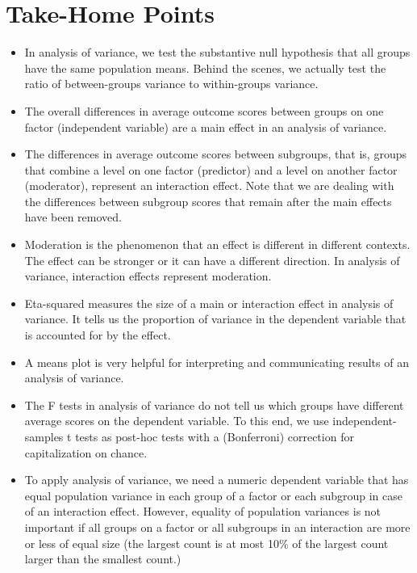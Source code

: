 \documentclass[a4paper]{book}
\theoremstyle{definition}
\theoremstyle{definition}
\theoremstyle{definition}
\theoremstyle{remark}
\begin{document}
\section{Take-Home Points}\label{take-home-points-6}

\begin{itemize}
\item
  In analysis of variance, we test the substantive null hypothesis that
  all groups have the same population means. Behind the scenes, we
  actually test the ratio of between-groups variance to within-groups
  variance.
\item
  The overall differences in average outcome scores between groups on
  one factor (independent variable) are a main effect in an analysis of
  variance.
\item
  The differences in average outcome scores between subgroups, that is,
  groups that combine a level on one factor (predictor) and a level on
  another factor (moderator), represent an interaction effect. Note that
  we are dealing with the differences between subgroup scores that
  remain after the main effects have been removed.
\item
  Moderation is the phenomenon that an effect is different in different
  contexts. The effect can be stronger or it can have a different
  direction. In analysis of variance, interaction effects represent
  moderation.
\item
  Eta-squared measures the size of a main or interaction effect in
  analysis of variance. It tells us the proportion of variance in the
  dependent variable that is accounted for by the effect.
\item
  A means plot is very helpful for interpreting and communicating
  results of an analysis of variance.
\item
  The F tests in analysis of variance do not tell us which groups have
  different average scores on the dependent variable. To this end, we
  use independent-samples t tests as post-hoc tests with a (Bonferroni)
  correction for capitalization on chance.
\item
  To apply analysis of variance, we need a numeric dependent variable
  that has equal population variance in each group of a factor or each
  subgroup in case of an interaction effect. However, equality of
  population variances is not important if all groups on a factor or all
  subgroups in an interaction are more or less of equal size (the
  largest count is at most 10\% of the largest count larger than the
  smallest count.)
\end{itemize}
\end{document}
